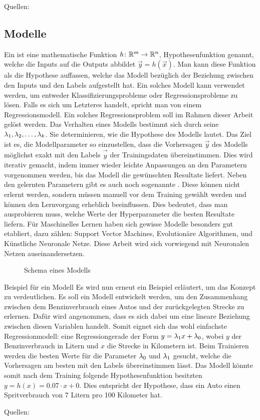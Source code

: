 \para{}
Quellen: \cite{Nielsen} \cite{book:hands-on}

\subsection{Modelle}
Ein  ist eine mathematische Funktion $\mathit{h}\colon \mathbb{R}^m
\to \mathbb{R}^n$, Hypothesenfunktion genannt, welche die Inputs auf die Outputs abbildet $\vec{y}=\mathit{h}(\vec{x})$.
Man kann diese Funktion als die Hypothese auffassen, welche das Modell bezüglich der Beziehung zwischen
den Inputs und den Labels aufgestellt hat.
Ein solches Modell kann verwendet werden, um entweder
Klassifizierungsprobleme oder Regressionsprobleme zu lösen. Falls es sich um
Letzteres handelt, spricht man von einem Regressionsmodell. Ein solches
Regressionsproblem soll im Rahmen dieser Arbeit gelöst werden.
\para{}
Das Verhalten eines Modells bestimmt sich durch seine 
$\lambda_1, \lambda_2,\ldots,\lambda_k$. Sie determinieren, wie die Hypothese des Modells lautet.
Das Ziel ist es, die Modellparameter so einzustellen, dass die Vorhersagen
$\vec{y}$ des Modells möglichst exakt mit den Labels $\vec{\hat{y}}$ der Trainingsdaten übereinstimmen.
Dies wird iterativ gemacht, indem immer wieder leichte Anpassungen an den
Parametern vorgenommen werden, bis das Modell die gewünschten Resultate liefert.
\para{}
Neben den gelernten Parametern gibt es auch noch sogenannte .
Diese können nicht erlernt werden, sondern müssen manuell vor dem Training gewählt werden und können den Lernvorgang erheblich beeinflussen.
Dies bedeutet, dass man ausprobieren muss, welche Werte der Hyperparameter
die besten Resultate liefern.
\para{}
Für Maschinelles Lernen haben sich gewisse Modelle besonders gut etabliert,
dazu zählen: Support Vector Machines, Evolutionäre Algorithmen, und Künstliche Neuronale Netze.
Diese Arbeit wird sich vorwiegend mit Neuronalen Netzen auseinandersetzen.
\para{}
\begin{figure}[h!]
  \centering

  \caption{Schema eines Modells}
\end{figure}
\para{}
\begin{examplebox}{Beispiel für ein Modell}
Es wird nun erneut ein Beispiel erläutert, um das Konzept zu verdeutlichen.
Es soll ein Modell entwickelt werden, um den Zusammenhang zwischen dem
Benzinverbrauch eines Autos und der zurückgelegten Strecke zu erlernen.
Dafür wird angenommen, dass es sich dabei um eine lineare Beziehung zwischen
diesen Variablen handelt. Somit eignet sich das wohl einfachste
Regressionmodell: eine Regressiongerade der Form $y=\lambda_1x + \lambda_0$, wobei
$y$ der Benzinverbrauch in Litern und $x$ die Strecke in Kilometern ist.
Beim Trainieren werden die besten Werte für die Parameter $\lambda_0$ und
$\lambda_1$ gesucht, welche die Vorhersagen am besten mit den Labels
übereinstimmen lässt. Das Modell könnte somit nach dem Training folgende
Hypothesenfunktion besitzten $y = h(x) = 0.07 \cdot x + 0$. Dies entspricht der
Hypothese, dass ein Auto einen Spritverbrauch von 7 Litern pro 100 Kilometer hat.
\end{examplebox}
\para{}
Quellen: \cite{book:hands-on}

